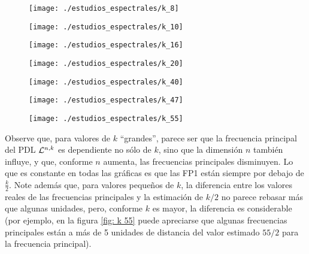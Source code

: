 \begin{figure}[H]
	\sidecaption{
	\label{fig: k 8}
	}
	\centering
	\texttt{[image: ./estudios\_espectrales/k\_8]} 
\end{figure}

\begin{figure}[H]
	\sidecaption{
	\label{fig: k 10}
	}
	\centering
	\texttt{[image: ./estudios\_espectrales/k\_10]} 
\end{figure}

\begin{figure}[H]
	\sidecaption{
	\label{fig: k 16}
	}
	\centering
	\texttt{[image: ./estudios\_espectrales/k\_16]} 
\end{figure}

\begin{figure}[H]
	\sidecaption{
	\label{fig: k 20}
	}
	\centering
	\texttt{[image: ./estudios\_espectrales/k\_20]} 
\end{figure}

\begin{figure}[H]
	\sidecaption{
	\label{fig: k 40}
	}
	\centering
	\texttt{[image: ./estudios\_espectrales/k\_40]} 
\end{figure}

\begin{figure}[H]
	\sidecaption{
	\label{fig: k 47}
	}
	\centering
	\texttt{[image: ./estudios\_espectrales/k\_47]} 
\end{figure}

\begin{figure}[H]
	\sidecaption{
	\label{fig: k 55}
	}
	\centering
	\texttt{[image: ./estudios\_espectrales/k\_55]} 
\end{figure}

Observe que, para valores de $k$ ``grandes'', parece ser que 
la frecuencia principal del PDL $\mathcal{L}^{n,k}$
es dependiente no sólo de $k$, sino que la dimensión $n$
también influye, y que, conforme $n$ aumenta, las
frecuencias principales disminuyen.
Lo que es constante en todas las gráficas es que 
las FP1 están siempre por debajo de
$\frac{k}{2}$.
Note además que, para valores pequeños de $k$, la diferencia
entre los valores reales de las frecuencias principales
y la estimación de $k/2$ no parece rebasar más que algunas
unidades, pero, conforme $k$ es mayor, la diferencia
es considerable (por ejemplo, en la figura \ref{fig: k 55}
puede apreciarse que algunas frecuencias principales están
a más de 5 unidades de distancia del valor estimado $55/2$
para la frecuencia principal). 


